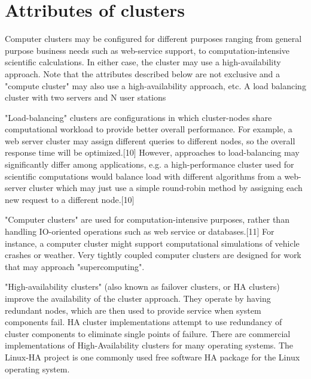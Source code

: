 \cleardoublepage
{}
\chapter{Attributes of clusters}

Computer clusters may be configured for different purposes ranging from general purpose business needs such as web-service support, to computation-intensive scientific calculations. In either case, the cluster may use a high-availability approach. Note that the attributes described below are not exclusive and a "compute cluster" may also use a high-availability approach, etc.
A load balancing cluster with two servers and N user stations

"Load-balancing" clusters are configurations in which cluster-nodes share computational workload to provide better overall performance. For example, a web server cluster may assign different queries to different nodes, so the overall response time will be optimized.[10] However, approaches to load-balancing may significantly differ among applications, e.g. a high-performance cluster used for scientific computations would balance load with different algorithms from a web-server cluster which may just use a simple round-robin method by assigning each new request to a different node.[10]

"Computer clusters" are used for computation-intensive purposes, rather than handling IO-oriented operations such as web service or databases.[11] For instance, a computer cluster might support computational simulations of vehicle crashes or weather. Very tightly coupled computer clusters are designed for work that may approach "supercomputing".

"High-availability clusters" (also known as failover clusters, or HA clusters) improve the availability of the cluster approach. They operate by having redundant nodes, which are then used to provide service when system components fail. HA cluster implementations attempt to use redundancy of cluster components to eliminate single points of failure. There are commercial implementations of High-Availability clusters for many operating systems. The Linux-HA project is one commonly used free software HA package for the Linux operating system.